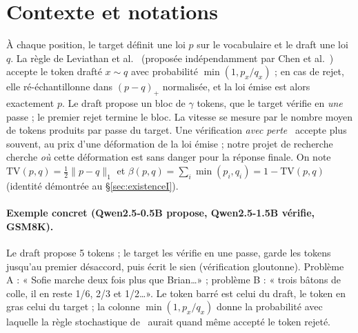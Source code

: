 \documentclass[11pt,a4paper]{article}
\newcommand{\TV}{\mathrm{TV}}
\newcommand{\nr}[1]{\|#1\|}
\theoremstyle{plain}
\theoremstyle{definition}
\begin{document}
\section{Contexte et notations}\label{sec:contexte}
À chaque position, le target définit une loi $p$ sur le vocabulaire et le draft une loi $q$.
La règle de Leviathan et al.~\cite{leviathan} (proposée indépendamment par Chen et al.~\cite{chen}) accepte le token drafté $x\sim q$ avec probabilité $\min(1,p_x/q_x)$ ; en cas de rejet, elle ré-échantillonne dans $(p-q)_+$ normalisée, et la loi émise est alors exactement $p$.
Le draft propose un bloc de $\gamma$ tokens, que le target vérifie en \emph{une} passe ; le premier rejet termine le bloc.
La vitesse se mesure par le nombre moyen de tokens produits par passe du target.
Une vérification \emph{avec perte}~\cite{fuzzy} accepte plus souvent, au prix d'une déformation de la loi émise ; notre projet de recherche cherche \emph{où} cette déformation est sans danger pour la réponse finale.
On note $\TV(p,q)=\tfrac12\nr{p-q}_1$ et $\beta(p,q)=\sum_i\min(p_i,q_i)=1-\TV(p,q)$ (identité démontrée au §\ref{sec:existenceI}).

\paragraph{Exemple concret (Qwen2.5-0.5B propose, Qwen2.5-1.5B vérifie, GSM8K).}
Le draft propose 5 tokens ; le target les vérifie en une passe, garde les tokens jusqu'au premier désaccord, puis écrit le sien (vérification gloutonne).
Problème A : « Sofie marche deux fois plus que Brian\dots » ; problème B : « trois bâtons de colle, il en reste 1/6, 2/3 et 1/2\dots ».
Le token barré est celui du draft, le token en gras celui du target ; la colonne $\min(1,p_x/q_x)$ donne la probabilité avec laquelle la règle stochastique de~\cite{leviathan} aurait quand même accepté le token rejeté.
\end{document}
